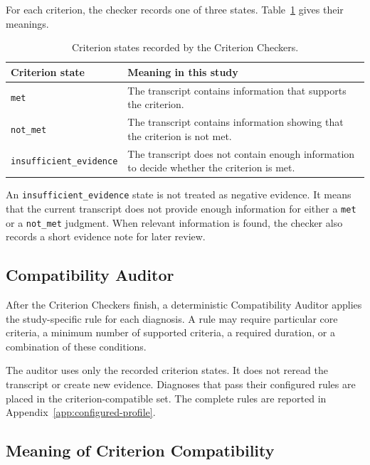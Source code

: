 For each criterion, the checker records one of three states. Table~\ref{tab:criterion-state-definitions} gives their meanings.

\begin{table}[htbp]
\centering
\caption{Criterion states recorded by the Criterion Checkers.}
\label{tab:criterion-state-definitions}
\small
\begin{tabularx}{\textwidth}{|>{\raggedright\arraybackslash}p{3.6cm}|>{\raggedright\arraybackslash}X|}
\hline
\textbf{Criterion state} & \textbf{Meaning in this study}\\
\hline
\texttt{met} & The transcript contains information that supports the criterion.\\
\hline
\texttt{not\_met} & The transcript contains information showing that the criterion is not met.\\
\hline
\texttt{insufficient\_\allowbreak{}evidence} & The transcript does not contain enough information to decide whether the criterion is met.\\
\hline
\end{tabularx}
\end{table}

An \texttt{insufficient\_\allowbreak{}evidence} state is not treated as negative evidence. It means that the current transcript does not provide enough information for either a \texttt{met} or a \texttt{not\_met} judgment. When relevant information is found, the checker also records a short evidence note for later review.

\subsection{Compatibility Auditor}
\label{sec:compatibility-auditor}

After the Criterion Checkers finish, a deterministic Compatibility Auditor applies the study-specific rule for each diagnosis. A rule may require particular core criteria, a minimum number of supported criteria, a required duration, or a combination of these conditions.

The auditor uses only the recorded criterion states. It does not reread the transcript or create new evidence. Diagnoses that pass their configured rules are placed in the criterion-compatible set. The complete rules are reported in Appendix~\ref{app:configured-profile}.

\subsection{Meaning of Criterion Compatibility}
\label{sec:criterion-compatibility-boundary}

